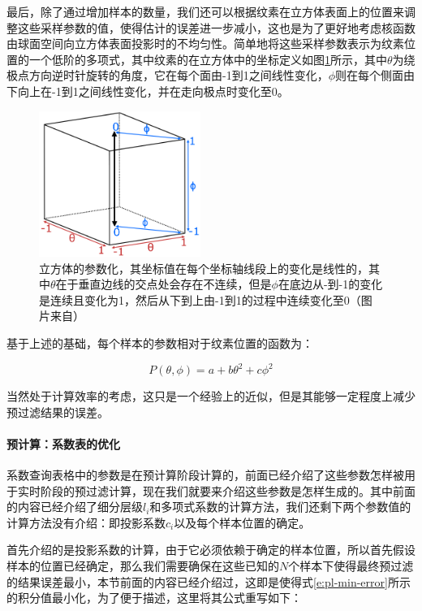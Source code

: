 最后，除了通过增加样本的数量，我们还可以根据纹素在立方体表面上的位置来调整这些采样参数的值，使得估计的误差进一步减小，这也是为了更好地考虑核函数由球面空间向立方体表面投影时的不均匀性。\cite{a:FastFilteringofReflectionProbes}简单地将这些采样参数表示为纹素位置的一个低阶的多项式，其中纹素的在立方体中的坐标定义如图\ref{f:pl-polynomials}所示，其中$\theta$为绕极点方向逆时针旋转的角度，它在每个面由-1到1之间线性变化，$\phi$则在每个侧面由下向上在-1到1之间线性变化，并在走向极点时变化至0。

\begin{figure}
	\sidecaption
	\includegraphics[width=0.47\textwidth]{figures/pl/polynomials}
	\caption{立方体的参数化，其坐标值在每个坐标轴线段上的变化是线性的，其中$\theta$在于垂直边线的交点处会存在不连续，但是$\phi$在底边从-到-1的变化是连续且变化为1，然后从下到上由-1到1的过程中连续变化至0（图片来自\cite{a:FastFilteringofReflectionProbes}）}
	\label{f:pl-polynomials}
\end{figure}

基于上述的基础，每个样本的参数相对于纹素位置的函数为：

\begin{equation}
	P(\theta,\phi)=a+b\theta^{2}+c\phi^{2}
\end{equation}

当然处于计算效率的考虑，这只是一个经验上的近似，但是其能够一定程度上减少预过滤结果的误差。



\paragraph{预计算：系数表的优化}
系数查询表格中的参数是在预计算阶段计算的，前面已经介绍了这些参数怎样被用于实时阶段的预过滤计算，现在我们就要来介绍这些参数是怎样生成的。其中前面的内容已经介绍了细分层级$l_i$和多项式系数的计算方法，我们还剩下两个参数值的计算方法没有介绍：即投影系数$c_i$以及每个样本位置的确定。

首先介绍的是投影系数的计算，由于它必须依赖于确定的样本位置，所以首先假设样本的位置已经确定，那么我们需要确保在这些已知的$N$个样本下使得最终预过滤的结果误差最小，本节前面的内容已经介绍过，这即是使得式\ref{e:pl-min-error}所示的积分值最小化，为了便于描述，这里将其公式重写如下：

